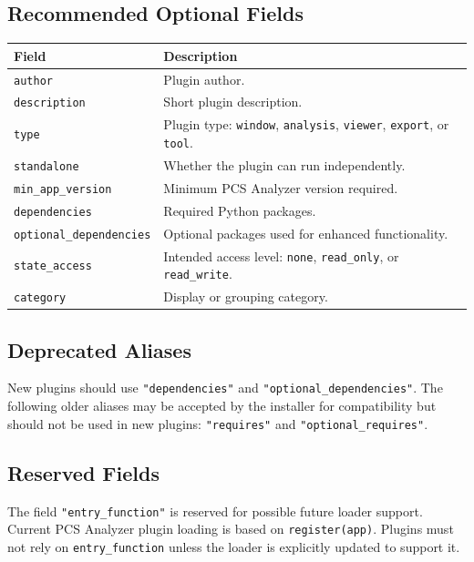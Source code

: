 \documentclass[11pt, a4paper]{article}
\begin{document}
\subsection{Recommended Optional Fields}

\begin{tabularx}{\linewidth}{@{}M{3.8cm}L@{}}
  \toprule
  \textbf{Field} & \textbf{Description} \\
  \midrule
  \texttt{author} & Plugin author. \\
  \texttt{description} & Short plugin description. \\
  \texttt{type} & Plugin type: \texttt{window}, \texttt{analysis}, \texttt{viewer}, \texttt{export}, or \texttt{tool}. \\
  \texttt{standalone} & Whether the plugin can run independently. \\
  \texttt{min\_app\_version} & Minimum PCS Analyzer version required. \\
  \texttt{dependencies} & Required Python packages. \\
  \texttt{optional\_dependencies} & Optional packages used for enhanced functionality. \\
  \texttt{state\_access} & Intended access level: \texttt{none}, \texttt{read\_only}, or \texttt{read\_write}. \\
  \texttt{category} & Display or grouping category. \\
  \bottomrule
\end{tabularx}

\subsection{Deprecated Aliases}

New plugins should use \texttt{"dependencies"} and \texttt{"optional\_dependencies"}. The following older aliases may be accepted by the installer for compatibility but should not be used in new plugins: \texttt{"requires"} and \texttt{"optional\_requires"}.

\subsection{Reserved Fields}

The field \texttt{"entry\_function"} is reserved for possible future loader support. Current PCS Analyzer plugin loading is based on \texttt{register(app)}. Plugins must not rely on \texttt{entry\_function} unless the loader is explicitly updated to support it.
\end{document}

